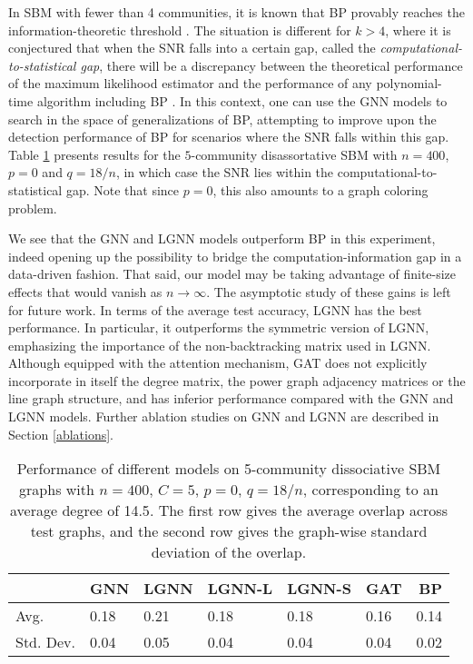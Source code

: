 \documentclass{article} \usepackage{iclr2019_conference,times}
\begin{document}
In SBM with fewer than 4 communities, it is known 
that BP provably reaches the information-theoretic threshold \citep{abbe2017community,massoulie2014community,coja2016information}. The situation is different for $k>4$, where it is 
conjectured that when the SNR falls into a certain gap, called the \textit{computational-to-statistical gap}, there will be a discrepancy between the theoretical performance of the maximum likelihood estimator and the performance of any polynomial-time algorithm including BP \citep{decelle2011asymptotic}.
In this context, one can use the GNN models to search in the space of generalizations of BP, attempting to improve upon the detection performance of BP for scenarios where the SNR falls within this gap. 
Table \ref{comp-stat-gaps} presents results for the $5$-community disassortative SBM with $n=400$, $p=0$ and $q=18/n$, in which case the SNR lies within the computational-to-statistical gap.
Note that since $p=0$, this also amounts to a graph coloring problem.  

We see that the GNN and LGNN models outperform BP in this experiment, indeed opening up the possibility to bridge the computation-information gap in a data-driven fashion. That said,
our model may be taking advantage of finite-size effects that would vanish as $n\to \infty$. The asymptotic study of these gains is left for future work. In terms of the average test accuracy, LGNN has the best performance. In particular, it outperforms the symmetric version of LGNN, emphasizing the importance of the non-backtracking matrix used in LGNN. Although equipped with the attention mechanism, GAT does not explicitly incorporate in itself the degree matrix, the power graph adjacency matrices or the line graph structure, and has inferior performance compared with the GNN and LGNN models. Further ablation studies on GNN and LGNN are described in Section \ref{ablations}.







\begin{table}[]
\centering
\tabcolsep=0.09cm
\begin{tabular}{l|l|l|l|l|l|l}
\multicolumn{1}{r|}{} & \multicolumn{1}{r|}{GNN} & \multicolumn{1}{r|}{LGNN} & \multicolumn{1}{r|}{LGNN-L} & \multicolumn{1}{r|}{LGNN-S} & \multicolumn{1}{r|}{GAT} & \multicolumn{1}{r}{BP} \\ \hline
Avg. & 0.18 & 0.21 & 0.18 & 0.18 & 0.16 & 0.14 \\
Std. Dev. & 0.04 & 0.05 & 0.04 & 0.04 & 0.04 & 0.02
\end{tabular}
\caption{\footnotesize{Performance of different models on 5-community dissociative SBM graphs with $n=400$, $C=5$, $p=0$, $q=18/n$, corresponding
to an average degree of 14.5}. The first row gives the average overlap across test graphs, and the second row gives the graph-wise standard deviation of the overlap.}
\label{comp-stat-gaps}
\end{table}
\end{document}
